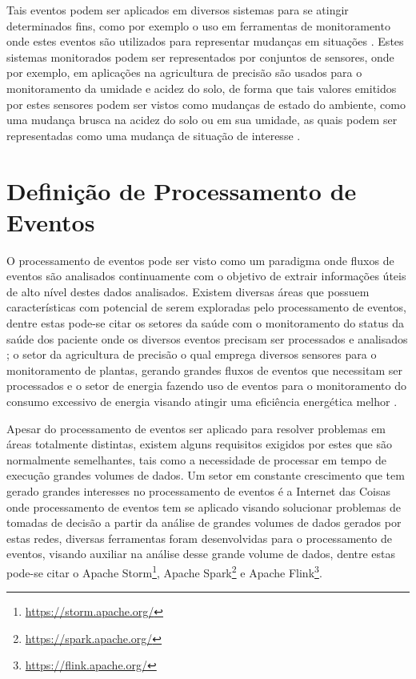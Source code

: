 \documentclass[ti,table]{texufpel} %
\begin{document}
Tais eventos podem ser aplicados em diversos sistemas para se atingir determinados fins, como por exemplo o uso em ferramentas de monitoramento onde estes eventos são utilizados para representar mudanças em situações \cite{etzion2011event}. Estes sistemas monitorados podem ser representados por conjuntos de sensores, onde por exemplo, em aplicações na agricultura de precisão são usados para o monitoramento da umidade e acidez do solo, de forma que tais valores emitidos por estes sensores podem ser vistos como mudanças de estado do ambiente, como uma mudança brusca na acidez do solo ou em sua umidade, as quais podem ser representadas como uma mudança de situação de interesse \cite{garcia2011wireless}.

\section{Definição de Processamento de Eventos}
O processamento de eventos pode ser visto como um paradigma onde fluxos de eventos são analisados continuamente com o objetivo de extrair informações úteis de alto nível destes dados analisados. Existem diversas áreas que possuem características com potencial de serem exploradas pelo processamento de eventos, dentre estas pode-se citar os setores da saúde com o monitoramento do status da saúde dos paciente onde os diversos eventos precisam ser processados e analisados \cite{weiner2008health}; o setor da agricultura de precisão o qual emprega diversos sensores para o monitoramento de plantas, gerando grandes fluxos de eventos que necessitam ser processados \cite{garcia2011wireless} e o setor de energia fazendo uso de eventos para o monitoramento do consumo excessivo de energia visando atingir uma eficiência energética melhor \cite{vijayaraghavan2010automated}. 

Apesar do processamento de eventos ser aplicado para resolver problemas em áreas totalmente distintas, existem alguns requisitos exigidos por estes que são normalmente semelhantes, tais como a necessidade de processar em tempo de execução grandes volumes de dados. Um setor em constante  crescimento que tem gerado grandes interesses no processamento de eventos é a Internet das Coisas onde processamento de eventos tem se aplicado visando solucionar problemas de tomadas de decisão a partir da análise de grandes volumes de dados gerados por estas redes, diversas ferramentas foram desenvolvidas para o processamento de eventos, visando auxiliar na análise desse grande volume de dados, dentre estas pode-se citar o Apache Storm\footnote{\url{https://storm.apache.org/}}, Apache Spark\footnote{\url{https://spark.apache.org/}} e Apache Flink\footnote{\url{https://flink.apache.org/}}.
\end{document}
